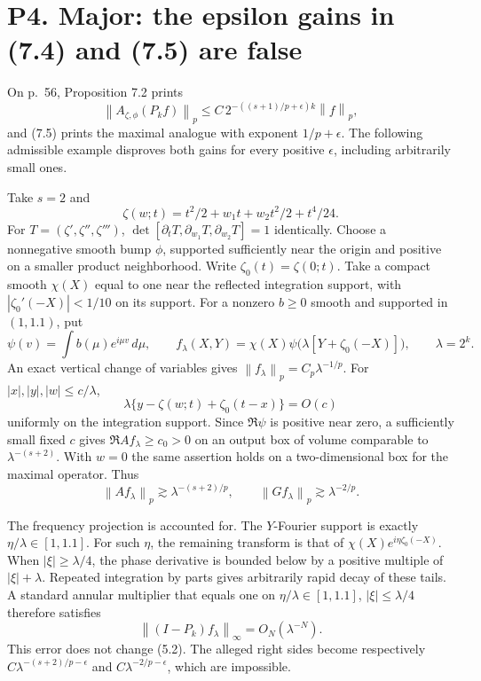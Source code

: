 \documentclass[10pt]{article}
\begin{document}
\section*{P4. Major: the epsilon gains in (7.4) and (7.5) are false}
On p. 56, Proposition 7.2 prints \[\left\|A_{\zeta,\phi}(P_kf)\right\|_p
 \le C\,2^{-((s+1)/p+\epsilon)k}\left\|f\right\|_p,
 \tag{5.1}\] and (7.5) prints the maximal analogue with exponent \(1/p+\epsilon\). The following admissible example disproves both gains for every positive \(\epsilon\), including arbitrarily small ones.\par
Take \(s=2\) and \[\zeta(w;t)=t^2/2+w_1t+w_2t^2/2+t^4/24.\] For \(T=(\zeta',\zeta'',\zeta''')\), \(\det[\partial_tT,\partial_{w_1}T,\partial_{w_2}T]=1\) identically. Choose a nonnegative smooth bump \(\phi\), supported sufficiently near the origin and positive on a smaller product neighborhood. Write \(\zeta_0(t)=\zeta(0;t)\). Take a compact smooth \(\chi(X)\) equal to one near the reflected integration support, with \(\left|\zeta_0'(-X)\right|<1/10\) on its support. For a nonzero \(b\ge0\) smooth and supported in \((1,1.1)\), put \[\psi(v)=\int b(\mu)e^{i\mu v}\,d\mu,\qquad
 f_\lambda(X,Y)=\chi(X)
       \psi\bigl(\lambda[Y+\zeta_0(-X)]\bigr),
 \qquad\lambda=2^k.\] An exact vertical change of variables gives \(\left\|f_\lambda\right\|_p=C_p\lambda^{-1/p}\). For \(\left|x\right|,\left|y\right|,\left|w\right|\le c/\lambda\), \[\lambda\{y-\zeta(w;t)+\zeta_0(t-x)\}=O(c)\] uniformly on the integration support. Since \(\Re\psi\) is positive near zero, a sufficiently small fixed \(c\) gives \(\Re A f_\lambda\ge c_0>0\) on an output box of volume comparable to \(\lambda^{-(s+2)}\). With \(w=0\) the same assertion holds on a two-dimensional box for the maximal operator. Thus \[\left\|Af_\lambda\right\|_p\gtrsim\lambda^{-(s+2)/p},
 \qquad
 \left\|Gf_\lambda\right\|_p\gtrsim\lambda^{-2/p}.
 \tag{5.2}\]\par
The frequency projection is accounted for. The \(Y\)-Fourier support is exactly \(\eta/\lambda\in[1,1.1]\). For such \(\eta\), the remaining transform is that of \(\chi(X)e^{i\eta\zeta_0(-X)}\). When \(\left|\xi\right|\ge\lambda/4\), the phase derivative is bounded below by a positive multiple of \(\left|\xi\right|+\lambda\). Repeated integration by parts gives arbitrarily rapid decay of these tails. A standard annular multiplier that equals one on \(\eta/\lambda\in[1,1.1]\), \(\left|\xi\right|\le\lambda/4\) therefore satisfies \[\left\|(I-P_k)f_\lambda\right\|_\infty=O_N(\lambda^{-N}).\] This error does not change (5.2). The alleged right sides become respectively \(C\lambda^{-(s+2)/p-\epsilon}\) and \(C\lambda^{-2/p-\epsilon}\), which are impossible.\par
\end{document}
